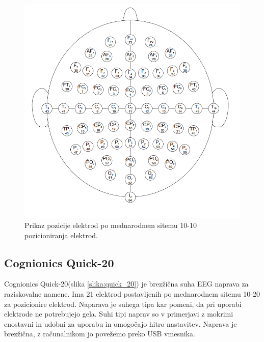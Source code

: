 \begin{figure}
        \begin{center}
        \includegraphics[width=1\linewidth]{slike/64electrodeSystem.png}
        \end{center}
        \caption{Prikaz pozicije elektrod po mednarodnem sitemu 10-10 pozicioniranja elektrod.  \cite{HttpsWwwPhysionet}}
        \label{slika:mednarodni_sistem_10}
        \end{figure}

\newpage

\subsection{Cognionics Quick-20}
Cognionics Quick-20(slika \ref{slika:quick_20}) je brezžična suha EEG naprava za raziskovalne namene. Ima 21 elektrod postavljenih po mednarodnem sitemu 10-20 za pozicionire elektrod. Naparava je suhega tipa kar pomeni, da pri uporabi elektrode ne potrebujejo gela. Suhi tipi naprav so v primerjavi z mokrimi enostavni in udobni za uporabu in omogočajo hitro nastavitev. Naprava je brezžična, z računalnikom jo povežemo preko USB vmesnika. \cite{DryEEGHeadset}

